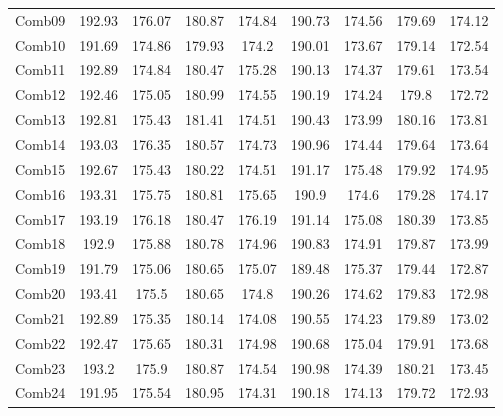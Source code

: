 \begin{table}[H]
{\begin{tabular}{|c|c|c|c|c|c|c|c|c|}
        Comb09	& 192.93	& 176.07	& 180.87	& 174.84	& 190.73	& 174.56	& 179.69	& 174.12 \\

        Comb10	& 191.69	& 174.86	& 179.93	& 174.2	& 190.01	& 173.67	& 179.14	& 172.54 \\

        Comb11	& 192.89	& 174.84	& 180.47	& 175.28	& 190.13	& 174.37	& 179.61	& 173.54 \\

        Comb12	& 192.46	& 175.05	& 180.99	& 174.55	& 190.19	& 174.24	& 179.8	& 172.72 \\

        Comb13	& 192.81	& 175.43	& 181.41	& 174.51	& 190.43	& 173.99	& 180.16	& 173.81 \\

        Comb14	& 193.03	& 176.35	& 180.57	& 174.73	& 190.96	& 174.44	& 179.64	& 173.64 \\

        Comb15	& 192.67	& 175.43	& 180.22	& 174.51	& 191.17	& 175.48	& 179.92	& 174.95 \\

        Comb16	& 193.31	& 175.75	& 180.81	& 175.65	& 190.9	& 174.6	& 179.28	& 174.17 \\
        
        \rowcolor{blue!10}
        Comb17	& 193.19	& 176.18	& 180.47	& 176.19	& 191.14	& 175.08	& 180.39	& 173.85 \\

        Comb18	& 192.9	& 175.88	& 180.78	& 174.96	& 190.83	& 174.91	& 179.87	& 173.99 \\

        Comb19	& 191.79	& 175.06	& 180.65	& 175.07	& 189.48	& 175.37	& 179.44	& 172.87 \\

        Comb20	& 193.41	& 175.5	& 180.65	& 174.8	& 190.26	& 174.62	& 179.83	& 172.98 \\

        Comb21	& 192.89	& 175.35	& 180.14	& 174.08	& 190.55	& 174.23	& 179.89	& 173.02 \\

        Comb22	& 192.47	& 175.65	& 180.31	& 174.98	& 190.68	& 175.04	& 179.91	& 173.68 \\

        Comb23	& 193.2	& 175.9	& 180.87	& 174.54	& 190.98	& 174.39	& 180.21	& 173.45 \\

        Comb24	& 191.95	& 175.54	& 180.95	& 174.31	& 190.18	& 174.13	& 179.72	& 172.93 \\


\end{tabular}}
\end{table}
